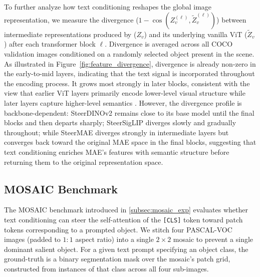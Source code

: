 To further analyze how text conditioning reshapes the global image representation, we measure the divergence ($1-\cos(Z_v^{(\ell)}, \tilde{Z}_v^{(\ell)})$) between intermediate representations produced by \model{} ($Z_v$) and its underlying vanilla ViT ($\tilde{Z}_v$) after each transformer block $\ell$. Divergence is averaged across all COCO validation images conditioned on a randomly selected object present in the scene.
As illustrated in Figure~\ref{fig:feature_divergence}, divergence is already non-zero in the early-to-mid layers, indicating that the text signal is incorporated throughout the encoding process. It grows most strongly in later blocks, consistent with the view that earlier ViT layers primarily encode lower-level visual structure while later layers capture higher-level semantics \cite{ghiasi2022visiontransformerslearnvisual}. 
However, the divergence profile is backbone-dependent: SteerDINOv2 remains close to its base model until the final blocks and then departs sharply; SteerSigLIP diverges slowly and gradually throughout; while SteerMAE diverges strongly in intermediate layers but converges back toward the original MAE space in the final blocks, suggesting that text conditioning enriches MAE's features with semantic structure before returning them to the original representation space.

\newpage


\subsection{MOSAIC Benchmark}


The MOSAIC benchmark introduced in \cref{subsec:mosaic_exp} evaluates whether text conditioning can steer the self-attention of the \texttt{[CLS]} token toward patch tokens corresponding to a prompted object.
We stitch four PASCAL-VOC~\cite{pascal_voc} images (padded to $1{:}1$ aspect ratio) into a single $2\times2$ mosaic to prevent a single dominant salient object.
For a given text prompt specifying an object class, the ground-truth is a binary segmentation mask over the mosaic's patch grid, constructed from instances of that class across all four sub-images.

